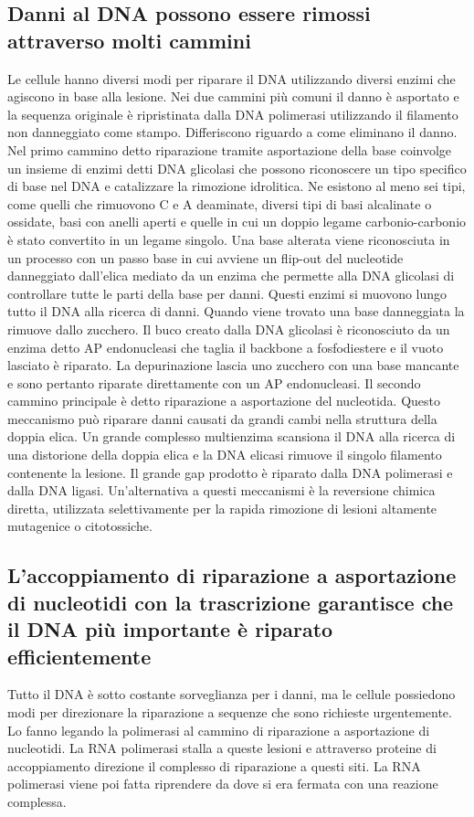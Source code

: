 \subsection{Danni al DNA possono essere rimossi attraverso molti cammini}
Le cellule hanno diversi modi per riparare il DNA utilizzando diversi enzimi che agiscono in base alla lesione. Nei due cammini pi\`u comuni il danno \`e asportato e la sequenza 
originale \`e ripristinata dalla DNA polimerasi utilizzando il filamento non danneggiato come stampo. Differiscono riguardo a come eliminano il danno. Nel primo cammino detto riparazione
tramite asportazione della base coinvolge un insieme di enzimi detti DNA glicolasi che possono riconoscere un tipo specifico di base nel DNA e catalizzare la rimozione idrolitica. Ne
esistono al meno sei tipi, come quelli che rimuovono C e A deaminate, diversi tipi di basi alcalinate o ossidate, basi con anelli aperti e quelle in cui un doppio legame 
carbonio-carbonio \`e stato convertito in un legame singolo. Una base alterata viene riconosciuta in un processo con un passo base in cui avviene un flip-out del nucleotide danneggiato
dall'elica mediato da un enzima che permette alla DNA glicolasi di controllare tutte le parti della base per danni. Questi enzimi si muovono lungo tutto il DNA alla ricerca di danni. 
Quando viene trovato una base danneggiata la rimuove dallo zucchero. Il buco creato dalla DNA glicolasi \`e riconosciuto da un enzima detto AP endonucleasi che taglia il backbone a 
fosfodiestere e il vuoto lasciato \`e riparato. La depurinazione lascia uno zucchero con una base mancante e sono pertanto riparate direttamente con un AP endonucleasi. Il secondo 
cammino principale \`e detto riparazione a asportazione del nucleotida. Questo meccanismo pu\`o riparare danni causati da grandi cambi nella struttura della doppia elica. Un grande
complesso multienzima scansiona il DNA alla ricerca di una distorione della doppia elica e la DNA elicasi rimuove il singolo filamento contenente la lesione. Il grande gap prodotto \`e
riparato dalla DNA polimerasi e dalla DNA ligasi. Un'alternativa a questi meccanismi \`e la reversione chimica diretta, utilizzata selettivamente per la rapida rimozione di lesioni
altamente mutagenice o citotossiche.
\subsection{L'accoppiamento di riparazione a asportazione di nucleotidi con la trascrizione garantisce che il DNA pi\`u importante \`e riparato efficientemente}
Tutto il DNA \`e sotto costante sorveglianza per i danni, ma le cellule possiedono modi per direzionare la riparazione a sequenze che sono richieste urgentemente. Lo fanno legando la
polimerasi al cammino di riparazione a asportazione di nucleotidi. La RNA polimerasi stalla a queste lesioni e attraverso proteine di accoppiamento direzione il complesso di riparazione
a questi siti. La RNA polimerasi viene poi fatta riprendere da dove si era fermata con una reazione complessa.
